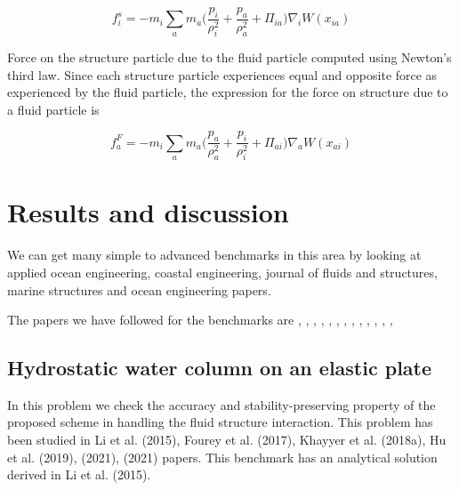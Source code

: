 \documentclass[preprint,12pt]{elsarticle}
\begin{document}
\begin{equation}
  f_i^s = -m_i \sum_{a} m_a \bigg(\frac{p_i}{\rho_{i}^2} +
  \frac{p_a}{\rho_{a}^2} + \Pi_{ia} \bigg) \nabla_{i} W(x_{ia})
\end{equation}

Force on the structure particle due to the fluid particle computed using
Newton's third law. Since each structure particle experiences equal and
opposite force as experienced by the fluid particle, the expression for the
force on structure due to a fluid particle is

\begin{equation}
  f_a^F = -m_i \sum_{a} m_a \bigg(\frac{p_a}{\rho_{a}^2} +
  \frac{p_i}{\rho_{i}^2} + \Pi_{ai} \bigg) \nabla_{a} W(x_{ai})
\end{equation}




\section{Results and discussion}
\label{sec:results}

We can get many simple to advanced benchmarks in this area by looking at
applied ocean engineering, coastal engineering, journal of fluids and
structures, marine structures and ocean engineering papers.


The papers we have followed for the benchmarks are
\citet{sun2021accurate}, \citet{yang2016numerical}, \citet{Sun2019study},
\citet{He2017coupled}, \citet{khayyer2018enhanced}, \citet{sun2015numerical},
\citet{wang2020scale}, \citet{peng2021coupling}, \citet{zhang2021deltasph},
\citet{zhan2019stabilized}, \citet{khayyer2021multi},
\citet{long2021coupling}, \citet{ng2020coupled},



\subsection{Hydrostatic water column on an elastic plate}
\label{sec:results:hstank-elastic-plate}


In this problem we check the accuracy and stability-preserving property of the
proposed scheme in handling the fluid structure interaction. This problem has
been studied in Li et al. (2015), Fourey et al. (2017), Khayyer et
al. (2018a), Hu et al. (2019), (2021), (2021) papers. This benchmark has an
analytical solution derived in Li et al. (2015).
\end{document}
